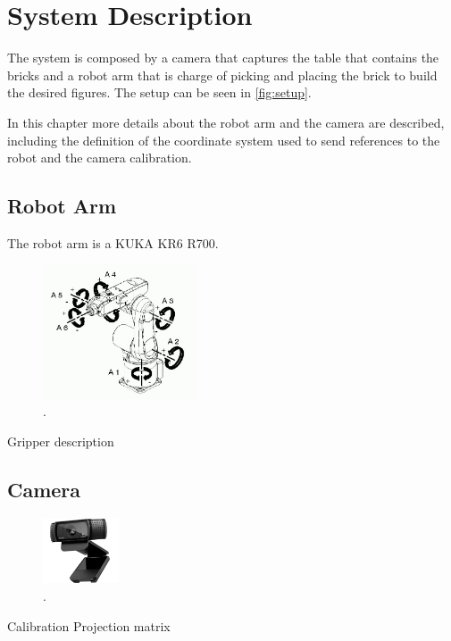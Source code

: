 \chapter{System Description}\label{chap:systemDescription}
The system is composed by a camera that captures the table that contains the bricks and a robot arm that is charge of picking and placing the brick to build the desired figures. The setup can be seen in \autoref{fig:setup}.


In this chapter more details about the robot arm and the camera are described, including the definition of the coordinate system used to send references to the robot and the camera calibration. 

\section{Robot Arm}
The robot arm is a KUKA KR6 R700.
\begin{figure}[H]
    \includegraphics[width=0.4\textwidth]{figures/kuka_axes.jpg}
    \caption{.\cite{kuka} }
    \label{fig:kuka_axes}
\end{figure}


Gripper description

\section{Camera}
\begin{figure}[H]
    \includegraphics[width=0.2\textwidth]{figures/camera.png}
    \caption{.\cite{camera} }
    \label{fig:camera}
\end{figure}

Calibration
Projection matrix

